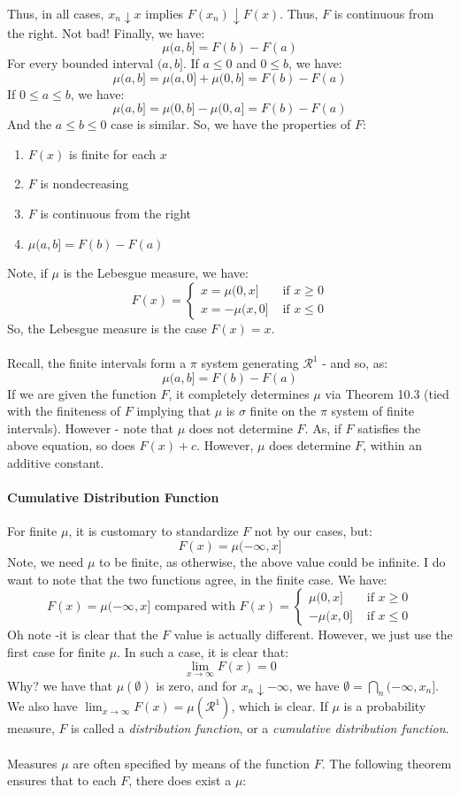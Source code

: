 \documentclass[12pt,a4paper]{article}
\newcommand{\1}[1]{\mathbbm{1}\left\{ #1 \right\}}
\newcommand{\rcal}{\mathcal{R}}
\begin{document}
Thus, in all cases, $x_n \downarrow x$ implies $F(x_n) \downarrow F(x)$. Thus, $F$ is continuous from the right. Not bad! Finally, we have:
$$
	\mu(a,b] = F(b) - F(a)
$$
For every bounded interval $(a,b]$. If $a \leq 0$ and $0 \leq b$, we have:
$$
	\mu(a,b] = \mu(a,0] + \mu(0,b] = F(b) - F(a)
$$
If $0 \leq a \leq b$, we have:
$$
	\mu(a,b] = \mu(0,b] - \mu(0,a] = F(b) - F(a)
$$
And the $a \leq b \leq 0$ case is similar. So, we have the properties of $F$:
\begin{enumerate}
	\item $F(x)$ is finite for each $x$
	\item $F$ is nondecreasing
	\item $F$ is continuous from the right
	\item $\mu(a,b] = F(b) - F(a)$
\end{enumerate}
Note, if $\mu$ is the Lebesgue measure, we have:
$$
	F(x) =
	\begin{cases}
	x = \mu(0,x] & \text{ if $x \geq 0$}\\
	x = -\mu(x,0] & \text{ if $x \leq 0$}
	\end{cases}
$$
So, the Lebesgue measure is the case $F(x) = x$.
\\\\
Recall, the finite intervals form a $\pi$ system generating $\rcal^1$ - and so, as:
$$
	\mu(a,b] = F(b) - F(a)
$$
If we are given the function $F$, it completely determines $\mu$ via Theorem 10.3 (tied with the finiteness of $F$ implying that $\mu$ is $\sigma$ finite on the $\pi$ system of finite intervals). However - note that $\mu$ does not determine $F$. As, if $F$ satisfies the above equation, so does $F(x) + c$. However, $\mu$ does determine $F$, within an additive constant.

\paragraph{Cumulative Distribution Function} For finite $\mu$, it is customary to standardize $F$ not by our cases, but:
$$
	F(x) = \mu(-\infty,x]
$$
Note, we need $\mu$ to be finite, as otherwise, the above value could be infinite. I do want to note that the two functions agree, in the finite case. We have:
$$
	F(x) = \mu(-\infty,x] \text{ compared with }
	F(x) = \begin{cases}
	\mu(0,x] & \text{ if $x \geq 0$}\\
	-\mu(x,0] & \text{ if $x \leq 0$}
	\end{cases}
$$
Oh note -it is clear that the $F$ value is actually different. However, we just use the first case for finite $\mu$. In such a case, it is clear that:
$$
	\lim_{x \to \infty} F(x) = 0
$$
Why? we have that $\mu(\emptyset)$ is zero, and for $x_n \downarrow -\infty$, we have $\emptyset = \bigcap_n (-\infty,x_n]$. We also have $\lim_{x \to \infty} F(x) = \mu(\rcal^1)$, which is clear. If $\mu$ is a probability measure, $F$ is called a \textit{distribution function}, or a \textit{cumulative distribution function}.
\\\\
Measures $\mu$ are often specified by means of the function $F$. The following theorem ensures that to each $F$, there does exist a $\mu$:
\end{document}
